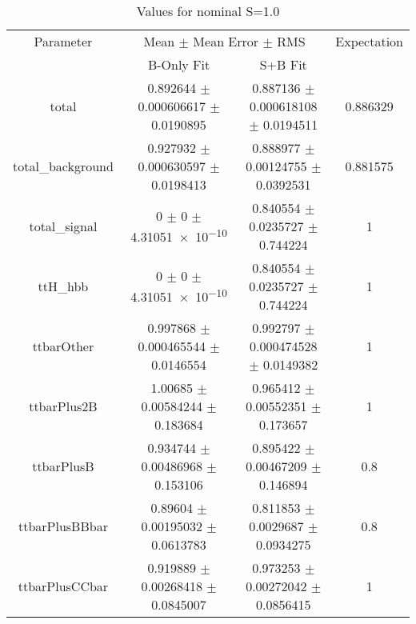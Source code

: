 \begin{table}
\centering
\caption{Values for nominal S=1.0}
\begin{tabular}{cccc}
\toprule
Parameter & \multicolumn{2}{c}{Mean $\pm$ Mean Error $\pm$ RMS} & Expectation\\
 & B-Only Fit & S+B Fit & \\
\midrule
total & \num{0.892644} $\pm$ \num{0.000606617} $\pm$ \num{0.0190895} & \num{0.887136} $\pm$ \num{0.000618108} $\pm$ \num{0.0194511} & \num{0.886329}\\
total\_background & \num{0.927932} $\pm$ \num{0.000630597} $\pm$ \num{0.0198413} & \num{0.888977} $\pm$ \num{0.00124755} $\pm$ \num{0.0392531} & \num{0.881575}\\
total\_signal & \num{0} $\pm$ \num{0} $\pm$ \num{4.31051e-10} & \num{0.840554} $\pm$ \num{0.0235727} $\pm$ \num{0.744224} & \num{1}\\
ttH\_hbb & \num{0} $\pm$ \num{0} $\pm$ \num{4.31051e-10} & \num{0.840554} $\pm$ \num{0.0235727} $\pm$ \num{0.744224} & \num{1}\\
ttbarOther & \num{0.997868} $\pm$ \num{0.000465544} $\pm$ \num{0.0146554} & \num{0.992797} $\pm$ \num{0.000474528} $\pm$ \num{0.0149382} & \num{1}\\
ttbarPlus2B & \num{1.00685} $\pm$ \num{0.00584244} $\pm$ \num{0.183684} & \num{0.965412} $\pm$ \num{0.00552351} $\pm$ \num{0.173657} & \num{1}\\
ttbarPlusB & \num{0.934744} $\pm$ \num{0.00486968} $\pm$ \num{0.153106} & \num{0.895422} $\pm$ \num{0.00467209} $\pm$ \num{0.146894} & \num{0.8}\\
ttbarPlusBBbar & \num{0.89604} $\pm$ \num{0.00195032} $\pm$ \num{0.0613783} & \num{0.811853} $\pm$ \num{0.0029687} $\pm$ \num{0.0934275} & \num{0.8}\\
ttbarPlusCCbar & \num{0.919889} $\pm$ \num{0.00268418} $\pm$ \num{0.0845007} & \num{0.973253} $\pm$ \num{0.00272042} $\pm$ \num{0.0856415} & \num{1}\\
\bottomrule
\end{tabular}
\end{table}